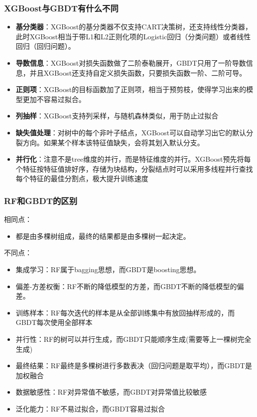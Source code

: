 \documentclass[12pt]{article}
\begin{document}
\subsubsection{XGBoost与GBDT有什么不同}
\begin{itemize}
\setlength{\itemsep}{0pt}
\setlength{\parsep}{0pt}
\setlength{\parskip}{0pt}
    \item \textbf{基分类器}：XGBoost的基分类器不仅支持CART决策树，还支持线性分类器，此时XGBoost相当于带L1和L2正则化项的Logistic回归（分类问题）或者线性回归（回归问题）。
    \item \textbf{导数信息}：XGBoost对损失函数做了二阶泰勒展开，GBDT只用了一阶导数信息，并且XGBoost还支持自定义损失函数，只要损失函数一阶、二阶可导。
    \item \textbf{正则项}：XGBoost的目标函数加了正则项，相当于预剪枝，使得学习出来的模型更加不容易过拟合。
    \item \textbf{列抽样}：XGBoost支持列采样，与随机森林类似，用于防止过拟合
    \item \textbf{缺失值处理}：对树中的每个非叶子结点，XGBoost可以自动学习出它的默认分裂方向。如果某个样本该特征值缺失，会将其划入默认分支。
    \item \textbf{并行化}：注意不是tree维度的并行，而是特征维度的并行。XGBoost预先将每个特征按特征值排好序，存储为块结构，分裂结点时可以采用多线程并行查找每个特征的最佳分割点，极大提升训练速度
\end{itemize}

\subsubsection{RF和GBDT的区别}
相同点：
\begin{itemize}
\setlength{\itemsep}{0pt}
\setlength{\parsep}{0pt}
\setlength{\parskip}{0pt}
    \item 都是由多棵树组成，最终的结果都是由多棵树一起决定。
\end{itemize}

不同点：
\begin{itemize}
\setlength{\itemsep}{0pt}
\setlength{\parsep}{0pt}
\setlength{\parskip}{0pt}
    \item 集成学习：RF属于bagging思想，而GBDT是boosting思想。
    \item 偏差-方差权衡：RF不断的降低模型的方差，而GBDT不断的降低模型的偏差。
    \item 训练样本：RF每次迭代的样本是从全部训练集中有放回抽样形成的，而GBDT每次使用全部样本
    \item 并行性：RF的树可以并行生成，而GBDT只能顺序生成(需要等上一棵树完全生成)
    \item 最终结果：RF最终是多棵树进行多数表决（回归问题是取平均），而GBDT是加权融合
    \item 数据敏感性：RF对异常值不敏感，而GBDT对异常值比较敏感
    \item 泛化能力：RF不易过拟合，而GBDT容易过拟合
\end{itemize}
\end{document}

